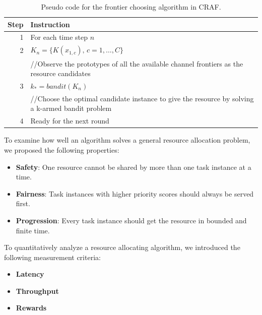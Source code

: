 \documentclass[conference]{IEEEtran}
\begin{document}
\begin{table}[h]
	\begin{tabular}{r | p{7.5cm}}
		Step & Instruction\\
		\hline
		\hline
		1 & For each time step $n$\\
		\hline
		2 & $K_n = \{K(x_{1,c}),\,c=1,\dots,C\}$\\
		  & //Observe the prototypes of all the available channel frontiers as the resource candidates\\
		\hline
		3 & $k_* = bandit(K_n)$\\
		  & //Choose the optimal candidate instance to give the resource by solving a k-armed bandit problem \\
		\hline
		4 & Ready for the next round\\
	\end{tabular}
	\caption{Pseudo code for the frontier choosing algorithm in CRAF. }
	\label{pseudo_code}
\end{table}

%
%
%
%

To examine how well an algorithm solves a general resource allocation problem, we proposed the following properties:

\begin{itemize}
\item \textbf{Safety}: One resource cannot be shared by more than one task instance at a time.
\item \textbf{Fairness}: Task instances with higher priority scores should always be served first. 
\item \textbf{Progression}: Every task instance should get the resource in bounded and finite time.
\end{itemize}

To quantitatively analyze a resource allocating algorithm, we introduced the following measurement criteria:
\begin{itemize}
\item \textbf{Latency}
\item \textbf{Throughput}
\item \textbf{Rewards}
\end{itemize}


\end{document}
